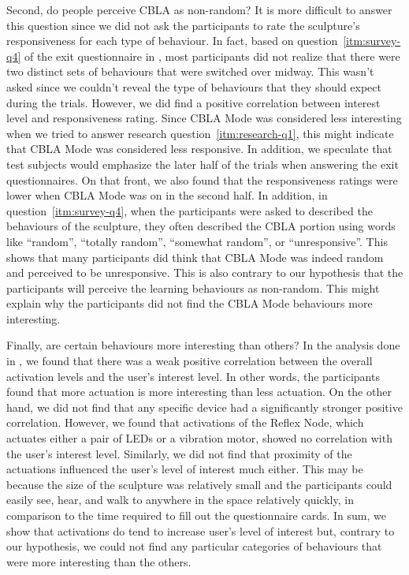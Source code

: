 Second, do people perceive CBLA as non-random? It is more difficult to answer this question since we did not ask the participants to rate the sculpture's responsiveness for each type of behaviour. In fact, based on question~\ref{itm:survey-q4} of the exit questionnaire in , most participants did not realize that there were two distinct sets of behaviours that were switched over midway. This wasn't asked since we couldn't reveal the type of behaviours that they should expect during the trials. However, we did find a positive correlation between interest level and responsiveness rating. Since CBLA Mode was considered less interesting when we tried to answer research question~\ref{itm:research-q1},  this might indicate that CBLA Mode was considered less responsive. In addition, we speculate that test subjects would emphasize the later half of the trials when answering the exit questionnaires. On that front, we also found that the responsiveness ratings were lower when CBLA Mode was on in the second half. In addition, in question~\ref{itm:survey-q4}, when the participants were asked to described the behaviours of the sculpture, they often described the CBLA portion using words like ``random'', ``totally random'', ``somewhat random'', or ``unresponsive''. This shows that many participants did think that CBLA Mode was indeed random and perceived to be unresponsive. This is also contrary to our hypothesis that the participants will perceive the learning behaviours as non-random. This might explain why the participants did not find the CBLA Mode behaviours more interesting. 

Finally, are certain behaviours more interesting than others? In the analysis done in , we found that there was a weak positive correlation between the overall activation levels and the user's interest level. In other words, the participants found that more actuation is more interesting than less actuation. On the other hand, we did not find that any specific device had a significantly stronger positive correlation. However, we found that activations of the Reflex Node, which actuates either a pair of LEDs or a vibration motor, showed no correlation with the user's interest level. Similarly, we did not find that proximity of the actuations influenced the user's level of interest much either. This may be because the size of the sculpture was relatively small and the participants could easily see, hear, and walk to anywhere in the space relatively quickly, in comparison to the time required to fill out the questionnaire cards. In sum, we show that activations do tend to increase user's level of interest but, contrary to our hypothesis, we could not find any particular categories of behaviours that were more interesting than the others. 


